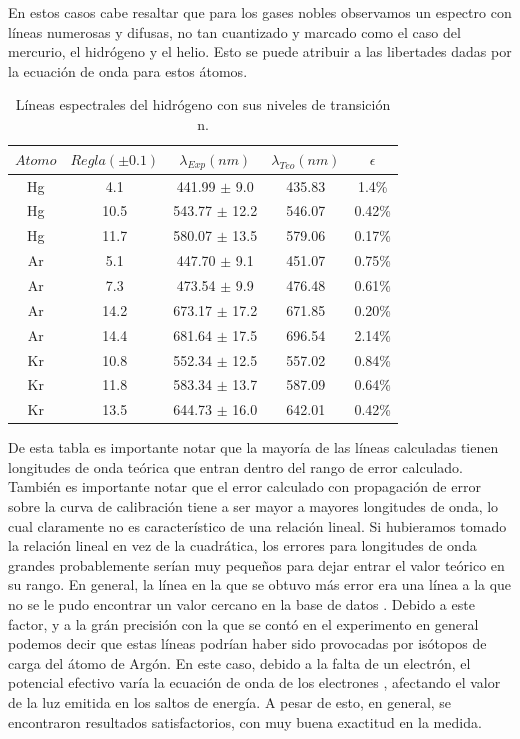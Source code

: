 \documentclass[%
 reprint,
 amsmath,amssymb,
 aps,
]{revtex4-1}
\begin{document}
En estos casos cabe resaltar que para los gases nobles observamos un espectro con líneas numerosas y difusas, no tan cuantizado y marcado como el caso del mercurio, el hidrógeno y el helio. Esto se puede atribuir a las libertades dadas por la ecuación de onda para estos átomos.\\

\begin{table}[h!]
\centering
 \begin{tabular}{|c|c|c|c|c|} 
 \hline
 $Atomo$ & $Regla (\pm0.1) $ & $\lambda_{Exp} (nm)$ & $\lambda_{Teo} (nm)$ & $\epsilon$\\ [0.5ex] 
 \hline\hline
 Hg & 4.1  &	441.99 $\pm$ 9.0  & 435.83 & 1.4\% \\
 Hg & 10.5 &	543.77 $\pm$ 12.2 & 546.07 & 0.42\% \\
 Hg & 11.7 &	580.07 $\pm$ 13.5 & 579.06 & 0.17\% \\
 \hline
 Ar & 5.1  &447.70 $\pm$ 9.1  & 451.07 & 0.75\% \\
 Ar & 7.3  &473.54 $\pm$ 9.9  & 476.48 & 0.61\% \\
 Ar & 14.2 &673.17 $\pm$ 17.2 & 671.85 & 0.20\% \\
 Ar & 14.4 &	681.64 $\pm$ 17.5 & 696.54 & 2.14\% \\
 \hline
 Kr & 10.8 &	 552.34  $\pm$ 12.5 & 557.02 & 0.84\% \\
 Kr & 11.8 &	 583.34  $\pm$ 13.7 & 587.09 & 0.64\% \\
 Kr & 13.5 &	 644.73  $\pm$ 16.0 & 642.01 & 0.42\% \\
[1ex] 
 \hline
 \end{tabular}
 \caption{Líneas espectrales del hidrógeno con sus niveles de transición n.}
 \label{table:otros}
\end{table}

De esta tabla es importante notar que la mayoría de las líneas calculadas tienen longitudes de onda teórica que entran dentro del rango de error calculado. También es importante notar que el error calculado con propagación de error sobre la curva de calibración tiene a ser mayor a mayores longitudes de onda, lo cual claramente no es característico de una relación lineal. Si hubieramos tomado la relación lineal en vez de la cuadrática, los errores para longitudes de onda grandes probablemente serían muy pequeños para dejar entrar el valor teórico en su rango. En general, la línea en la que se obtuvo más error era una línea a la que no se le pudo encontrar un valor cercano en la base de datos \cite{base}. Debido a este factor, y a la grán precisión con la que se contó en el experimento en general podemos decir que estas líneas podrían haber sido provocadas por isótopos de carga del átomo de Argón. En este caso, debido a la falta de un electrón, el potencial efectivo varía la ecuación de onda de los electrones , afectando el valor de la luz emitida en los saltos de energía. A pesar de esto, en general, se encontraron resultados satisfactorios, con muy buena exactitud en la medida.\\
\end{document}
